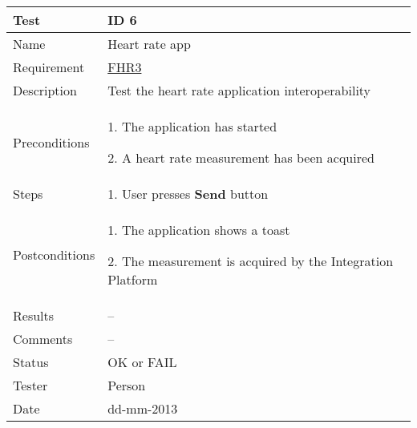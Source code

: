 \begin{table}
\begin{center}
\begin{tabular}{ | l | p{10cm} | }
	\hline
	\textbf{Test}	&	\textbf{ID 6} \\
	\hline\noalign{\smallskip}\noalign{\smallskip}\hline
	Name				& Heart rate app \\
	Requirement			& \hyperref[table:reqheartrate]{FHR3} \\
	Description			& Test the heart rate application interoperability \\
	Preconditions		&	\par 1. The application has started
							\par 2. A heart rate measurement has been acquired \\
	Steps 				&	\par 1. User presses \textbf{Send} button \\
	Postconditions		&	\par 1. The application shows a toast
							\par 2. The measurement is acquired by the Integration Platform \\
	Results				& -- \\
	Comments			& -- \\
	Status				& OK or FAIL \\
	Tester				& Person \\
	Date				& dd-mm-2013 \\
	\hline
\end{tabular}
\end{center}
\end{table}


